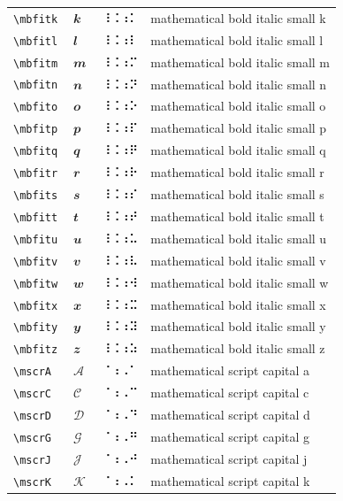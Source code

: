 \documentclass[oneside]{article}
\begin{document}
\begin{longtable}{llll}
\verb|\mbfitk| & $\mbfitk$ &  ⠸⠨⠰⠅  & {mathematical bold italic small k} \\[2ex]
\verb|\mbfitl| & $\mbfitl$ &  ⠸⠨⠰⠇  & {mathematical bold italic small l} \\[2ex]
\verb|\mbfitm| & $\mbfitm$ &  ⠸⠨⠰⠍  & {mathematical bold italic small m} \\[2ex]
\verb|\mbfitn| & $\mbfitn$ &  ⠸⠨⠰⠝  & {mathematical bold italic small n} \\[2ex]
\verb|\mbfito| & $\mbfito$ &  ⠸⠨⠰⠕  & {mathematical bold italic small o} \\[2ex]
\verb|\mbfitp| & $\mbfitp$ &  ⠸⠨⠰⠏  & {mathematical bold italic small p} \\[2ex]
\verb|\mbfitq| & $\mbfitq$ &  ⠸⠨⠰⠟  & {mathematical bold italic small q} \\[2ex]
\verb|\mbfitr| & $\mbfitr$ &  ⠸⠨⠰⠗  & {mathematical bold italic small r} \\[2ex]
\verb|\mbfits| & $\mbfits$ &  ⠸⠨⠰⠎  & {mathematical bold italic small s} \\[2ex]
\verb|\mbfitt| & $\mbfitt$ &  ⠸⠨⠰⠞  & {mathematical bold italic small t} \\[2ex]
\verb|\mbfitu| & $\mbfitu$ &  ⠸⠨⠰⠥  & {mathematical bold italic small u} \\[2ex]
\verb|\mbfitv| & $\mbfitv$ &  ⠸⠨⠰⠧  & {mathematical bold italic small v} \\[2ex]
\verb|\mbfitw| & $\mbfitw$ &  ⠸⠨⠰⠺  & {mathematical bold italic small w} \\[2ex]
\verb|\mbfitx| & $\mbfitx$ &  ⠸⠨⠰⠭  & {mathematical bold italic small x} \\[2ex]
\verb|\mbfity| & $\mbfity$ &  ⠸⠨⠰⠽  & {mathematical bold italic small y} \\[2ex]
\verb|\mbfitz| & $\mbfitz$ &  ⠸⠨⠰⠵  & {mathematical bold italic small z} \\[2ex]
\verb|\mscrA| & $\mscrA$ &  ⠈⠰⠠⠁  & {mathematical script capital a} \\[2ex]
\verb|\mscrC| & $\mscrC$ &  ⠈⠰⠠⠉  & {mathematical script capital c} \\[2ex]
\verb|\mscrD| & $\mscrD$ &  ⠈⠰⠠⠙  & {mathematical script capital d} \\[2ex]
\verb|\mscrG| & $\mscrG$ &  ⠈⠰⠠⠛  & {mathematical script capital g} \\[2ex]
\verb|\mscrJ| & $\mscrJ$ &  ⠈⠰⠠⠚  & {mathematical script capital j} \\[2ex]
\verb|\mscrK| & $\mscrK$ &  ⠈⠰⠠⠅  & {mathematical script capital k} \\[2ex]

\end{longtable}
\end{document}

